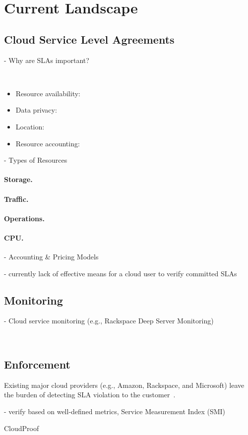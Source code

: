 \section{Current Landscape} \label{sect:current-practice}

\subsection{Cloud Service Level Agreements} \label{sect:sla-overview}

- Why are SLAs important?

~\cite{Ahr+10,FMM+13,Kyr13}

\begin{itemize}
 \item Resource availability:
 \item Data privacy:
 \item Location:
 \item Resource accounting:
\end{itemize}




- Types of Resources

\paragraph{Storage.}

\paragraph{Traffic.}

\paragraph{Operations.}

\paragraph{CPU.}

- Accounting \& Pricing Models~\cite{MMS13}


- currently lack of effective means for a cloud user to verify committed SLAs


\subsection{Monitoring} \label{sect:sla-monitoring}

- Cloud service monitoring (e.g., Rackspace Deep Server Monitoring)

~\cite{ABD+13,FEH+14}

\subsection{Enforcement} \label{sect:sla-enforcement}

Existing major cloud providers (e.g., Amazon, Rackspace, and Microsoft) leave the burden of detecting SLA violation to the customer~\cite{Bas12}.

- verify based on well-defined metrics, Service Measurement Index (SMI)

CloudProof~\cite{PLM+11}